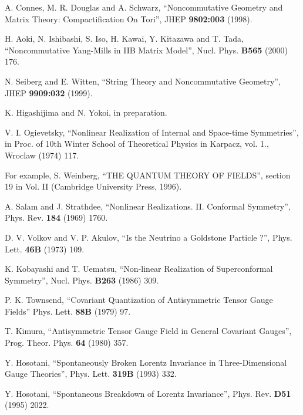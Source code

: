 \documentclass[a4paper,12pt]{article}
\begin{document}
\begin{thebibliography}{99}

A. Connes, M. R. Douglas and A. Schwarz,
``Noncommutative Geometry and Matrix Theory: Compactification On
Tori'',
JHEP {\bf 9802:003} (1998).

H. Aoki, N. Ishibashi, S. Iso, H. Kawai, Y. Kitazawa and T. Tada,
``Noncommutative Yang-Mills in IIB Matrix Model'',
Nucl. Phys. {\bf B565} (2000) 176. 

N. Seiberg and E. Witten,
``String Theory and Noncommutative Geometry'',
JHEP {\bf 9909:032} (1999).

K. Higashijima and N. Yokoi,
in preparation.

V. I. Ogievetsky, 
``Nonlinear Realization of Internal and Space-time Symmetries'',
in Proc. of 10th Winter School of Theoretical
Physics in Karpacz, vol. 1., Wroclaw (1974) 117.

For example, S. Weinberg,
``THE QUANTUM THEORY OF FIELDS'', section 19 in Vol. II 
(Cambridge University Press, 1996).

A. Salam and J. Strathdee,
``Nonlinear Realizations. II. Conformal Symmetry'',
Phys. Rev. {\bf 184} (1969) 1760.

D. V. Volkov and V. P. Akulov,
``Is the Neutrino a Goldstone Particle ?'',
Phys. Lett. {\bf 46B} (1973) 109.

K. Kobayashi and T. Uematsu,
``Non-linear Realization of Superconformal Symmetry'',
Nucl. Phys. {\bf B263} (1986) 309.

P. K. Townsend,
``Covariant Quantization of Antisymmetric Tensor Gauge Fields''
Phys. Lett. {\bf 88B} (1979) 97.

T. Kimura,
``Antisymmetric Tensor Gauge Field in General Covariant Gauges'',
Prog. Theor. Phys. {\bf 64} (1980) 357.

Y. Hosotani,
``Spontaneously Broken Lorentz Invariance in Three-Dimensional
Gauge Theories'',
Phys. Lett. {\bf 319B} (1993) 332.

Y. Hosotani,
``Spontaneous Breakdown of Lorentz Invariance'',
Phys. Rev. {\bf D51} (1995) 2022. 

\end{thebibliography}
\end{document}
